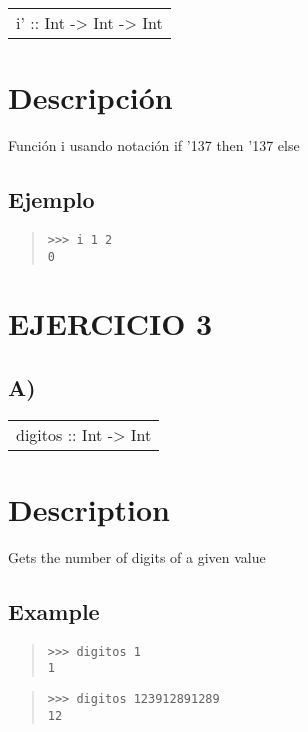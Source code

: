 \begin{haddockdesc}
\item[\begin{tabular}{@{}l}
i' :: Int -> Int -> Int
\end{tabular}]
{\haddockbegindoc
\section*{Descripción}
Función i usando notación if {\char '137} then {\char '137} else\par
\subsection*{Ejemplo}
\begin{quote}
{\haddockverb\begin{verbatim}
>>> i 1 2
0

\end{verbatim}}
\end{quote}}
\end{haddockdesc}
\section{EJERCICIO 3}
\subsection{A)}
\begin{haddockdesc}
\item[\begin{tabular}{@{}l}
digitos :: Int -> Int
\end{tabular}]
{\haddockbegindoc
\section*{Description}
Gets the number of digits of a given value\par
\subsection*{Example}
\begin{quote}
{\haddockverb\begin{verbatim}
>>> digitos 1
1

\end{verbatim}}
\end{quote}
\begin{quote}
{\haddockverb\begin{verbatim}
>>> digitos 123912891289
12

\end{verbatim}}
\end{quote}}
\end{haddockdesc}
